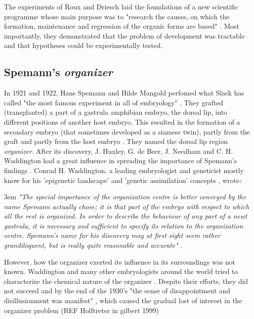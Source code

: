 The experiments of Roux and Driesch laid the foundations of a new scientific programme whose main purpose was to "research the causes, on which the formation, maintenance and regression of the organic forms are based" \citep{Roux1897}. 
Most importantly, they demonstrated that the problem of development was tractable and that hypotheses could be experimentally tested.

\subsection{Spemann's \textit{organizer}}

In 1921 and 1922, Hans Spemann and Hilde Mangold perfomed what Slack has called "the most famous experiment in all of embryology" \citep{slack2012egg}.
They grafted (transplanted) a part of a gastrula amphibian embryo, the dorsal lip, into different positions of another host embryo. This resulted in the formation of a secondary embryo (that sometimes developed as a siamese twin), partly from the graft and partly from the host embryo \citep{Spemann1924}. They named the dorsal lip region \textit{organizer}.
After its discovery, J. Huxley, G. de Beer, J. Needham and C. H. Waddington had a great influence in spreading the importance of Spemann's findings \citep{Horder2001}. Conrad H. Waddington, a leading embryologist and geneticist mostly know for his 'epigenetic landscape' and 'genetic assimilation' concepts \citep{Slack2002}, wrote:
\begin{flushleft}
\leftskip3em
\rightskip\leftskip
\footnotesize{
\textit{"The special importance of the organization centre is better conveyed by the name Spemann actually chose; it is that part of the embryo with respect to which all the rest is organized. In order to describe the behaviour of any part of a newt gastrula, it is necessary and sufficient to specify its relation to the organization centre. Spemann's name for his discovery may at first sight seem rather grandiloquent, but is really quite reasonable and accurate" \citep{Waddington1962}.} }
\end{flushleft}
However, how the organizer exerted its influence in its surroundings was not known. 
Waddington and many other embryologists around the world tried to characterize the chemical nature of the organizer \citep{Waddington1935,gilbert1991conceptual}.
Despite their efforts, they did not succeed and by the end of the 1930's "the sense of disappointment and disillusionment was manifest" \citep{Horder2010}, which caused the gradual lost of interest in the organizer problem (REF Holftreter in gilbert 1999) 


